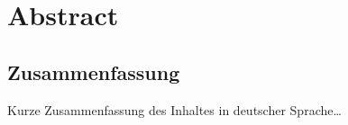 \begingroup
\let\clearpage\relax
\let\cleardoublepage\relax
\let\cleardoublepage\relax

\chapter*{Abstract}


\vfill

\begin{otherlanguage}{ngerman}
\chapter*{Zusammenfassung}
Kurze Zusammenfassung des Inhaltes in deutscher Sprache\dots 
\end{otherlanguage}

\endgroup			

\vfill